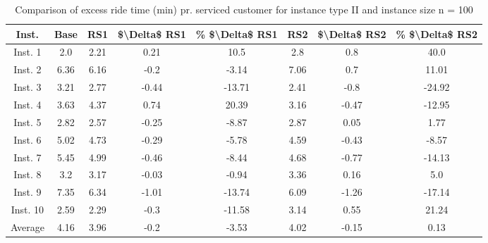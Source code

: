 \begin{table}[H]
\centering
\begin{tabular}{cccccccc}
  \hline
  \textbf{Inst.} & \textbf{Base} & \textbf{RS1} & \textbf{\$\textbackslash{}Delta\$  RS1} & \textbf{\% \$\textbackslash{}Delta\$  RS1} & \textbf{RS2} & \textbf{\$\textbackslash{}Delta\$  RS2} & \textbf{\% \$\textbackslash{}Delta\$  RS2} \\\hline
  Inst. 1 & 2.0 & 2.21 & 0.21 & 10.5 & 2.8 & 0.8 & 40.0 \\
  Inst. 2 & 6.36 & 6.16 & -0.2 & -3.14 & 7.06 & 0.7 & 11.01 \\
  Inst. 3 & 3.21 & 2.77 & -0.44 & -13.71 & 2.41 & -0.8 & -24.92 \\
  Inst. 4 & 3.63 & 4.37 & 0.74 & 20.39 & 3.16 & -0.47 & -12.95 \\
  Inst. 5 & 2.82 & 2.57 & -0.25 & -8.87 & 2.87 & 0.05 & 1.77 \\
  Inst. 6 & 5.02 & 4.73 & -0.29 & -5.78 & 4.59 & -0.43 & -8.57 \\
  Inst. 7 & 5.45 & 4.99 & -0.46 & -8.44 & 4.68 & -0.77 & -14.13 \\
  Inst. 8 & 3.2 & 3.17 & -0.03 & -0.94 & 3.36 & 0.16 & 5.0 \\
  Inst. 9 & 7.35 & 6.34 & -1.01 & -13.74 & 6.09 & -1.26 & -17.14 \\
  Inst. 10 & 2.59 & 2.29 & -0.3 & -11.58 & 3.14 & 0.55 & 21.24 \\
  Average & 4.16 & 3.96 & -0.2 & -3.53 & 4.02 & -0.15 & 0.13 \\\hline
\end{tabular}
\caption{Comparison of excess ride time (min) pr. serviced customer for instance type II and instance size n = 100}
\label{tab:wait:resrelocation-excess-ride-time-comparison_II_100}
\end{table}
